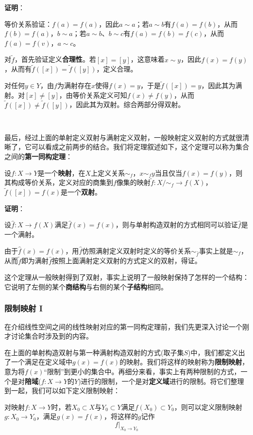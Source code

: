 \documentclass[a4paper,UTF8,fontset=windows,AutoFakeBold]{ctexart}
\newcommand{\proo}[1]{{\vspace{5pt}\kaishu\noindent\textbf{证明}：\vspace{-3pt}
\begin{compactitem}
    \item[] #1
\end{compactitem}
}}
\begin{document}
\proo{
    等价关系验证：$f(a)=f(a)$，因此$a\sim a$；若$a\sim b$有$f(a)=f(b)$，从而$f(b)=f(a)$，$b\sim a$；若$a\sim b$、$b\sim c$有$f(a)=f(b)=f(c)$，从而$f(a)=f(v)$，$a\sim c$。

    对$\tilde{f}$，首先验证定义\textbf{合理性}。若$[x]=[y]$，这意味着$x\sim y$，因此$f(x)=f(y)$，从而有$\tilde{f}([x])=\tilde{f}([y])$，定义合理。

    对任何$y\in Y$，由$f$为满射存在$x$使得$f(x)=y$，于是$\tilde{f}([x])=y$，因此其为满射。对$[x]\ne[y]$，由等价关系定义可知$f(x)\ne f(y)$，从而$\tilde{f}([x])\ne\tilde{f}([y])$，因此其为双射。综合两部分得双射。
}

\

最后，经过上面的单射定义双射与满射定义双射，一般映射定义双射的方式就很清晰了，它可以看成之前两步的结合。我们将定理叙述如下，这个定理可以称为集合之间的\textbf{第一同构定理}：

设$f:X\to Y$是一个\textbf{映射}，在$X$上定义关系$\sim_f$，$x\sim_fy$当且仅当$f(x)=f(y)$，则其构成等价关系，定义对应的商集到$f$像集的映射$\tilde{f}:X/\sim_f\to f(X)$，$\tilde{f}([x])=f(x)$是一个\textbf{双射}。

\proo{
    设$\hat{f}:X\to f(X)$满足$\hat{f}(x)=f(x)$，则与单射构造双射的方式相同可以验证$\hat{f}$是一个满射。

    由于$\hat{f}(x)=f(x)$，用$\hat{f}$仿照满射定义双射时定义的等价关系$\sim_{\hat{f}}$事实上就是$\sim_f$，从而$\tilde{f}$即为满射$\hat{f}$按照上面满射定义双射的方式定义的双射，得证。
}

这个定理从一般映射得到了双射，事实上说明了一般映射保持了怎样的一个结构：它说明了左侧的某个\textbf{商结构}与右侧的某个\textbf{子结构}相同。

\subsubsection{限制映射 I}
在介绍线性空间之间的线性映射对应的第一同构定理前，我们先更深入讨论一个刚才讨论集合时涉及到的内容。

在上面的单射构造双射与第一种满射构造双射的方式(取子集$S$)中，我们都定义出了一个满足在定义域中$g(x)=f(x)$的映射。我们将这样的映射称为\textbf{限制映射}，意为将$f(x)$``限制''到更小的集合中。再细分来看，事实上有两种限制的方式，一个是对\textbf{陪域}($f:X\to Y$的$Y$)进行的限制，一个是对\textbf{定义域}进行的限制。将它们整理到一起，我们可以如下定义限制映射：

对映射$f:X\to Y$时，若$X_0\subset X$与$Y_0\subset Y$满足$f(X_0)\subset Y_0$，则可以定义限制映射$g:X_0\to Y_0$，满足$g(x)=f(x)$，将这样的$g$记作
$$f|_{X_0\to Y_0}$$
\end{document}

